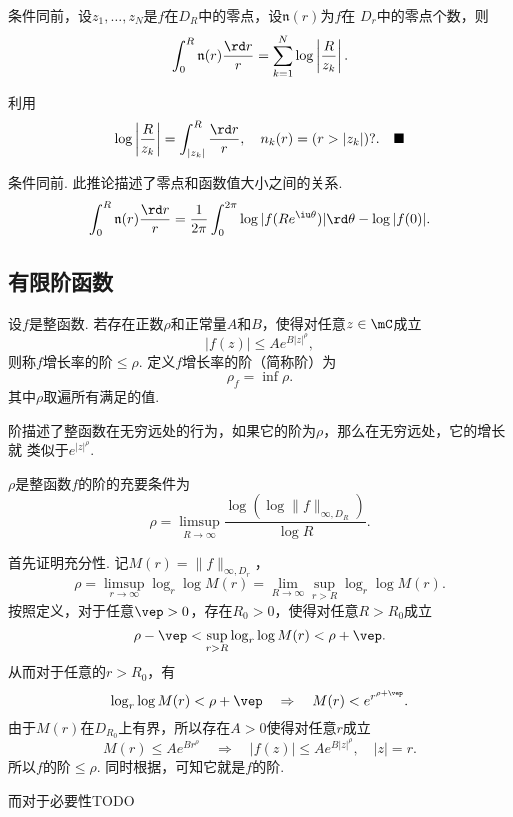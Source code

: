   \begin{lemma}
    条件同前，设$z_1,\dots,z_N$是$f$在$D_R$中的零点，设$\mathfrak{n}(r)$为$f$在
    $D_r$中的零点个数，则
    \[
      \int_0^R \mathfrak{n}(r)\frac{\rd r}{r} = 
      \sum_{k=1}^N\log\left| \frac{R}{z_k} \right|.
    \]
  \end{lemma}
  \proof
    利用
    \[
      \log\left| \frac{R}{z_k} \right|=\int_{|z_k|}^R\frac{\rd r}{r},
      \quad n_k(r) = ( r > |z_k| )?.\quad\blacksquare
    \]

  \begin{cor}
    \label{cor: 整函数、零点、模}
    条件同前. 此推论描述了零点和函数值大小之间的关系.
    \[
      \int_0^R\mathfrak{n}(r)\frac{\rd r}{r} = \frac{1}{2\pi}
      \int_0^{2\pi}\log|f(Re^{\iu\theta})|\rd\theta - \log|f(0)|.
    \]
  \end{cor}


\subsection{有限阶函数}
  \begin{defi}
    \label{defi: 整函数的阶}
    设$f$是整函数. 若存在正数$\rho$和正常量$A$和$B$，使得对任意$z\in\mC$成立
    \begin{equation}
      \label{equ: 整函数的阶、小于等于}
      |f(z)| \le Ae^{B|z|^\rho},
    \end{equation}
    则称$f$增长率的阶$\le\rho$. 定义$f$增长率的阶（简称阶）为
    \[
      \rho_f = \inf\rho.
    \]
    其中$\rho$取遍所有满足的值.
  \end{defi}
  \remark
    阶描述了整函数在无穷远处的行为，如果它的阶为$\rho$，那么在无穷远处，它的增长就
    类似于$e^{|z|^\rho}$.

  \begin{thm}[等价定义]
    $\rho$是整函数$f$的阶的充要条件为
    \[
      \rho = \limsup_{R\to\infty}\frac{\log(\log\|f\|_{\infty,D_R})}{\log R}.
    \]
  \end{thm}
  \proof
    首先证明充分性. 记$M(r) = \|f\|_{\infty, D_r}$，
    \[
      \rho = \limsup_{r\to\infty}\log_r\log M(r) = \lim_{R\to\infty}\sup_{r>R}
      \log_r\log M(r).
    \]
    按照定义，对于任意$\vep>0$，存在$R_0>0$，使得对任意$R>R_0$成立
    \begin{equation}
      \label{equ: 阶等价定义证明1}
      \rho - \vep < \sup_{r>R}\log_r\log M(r) < \rho + \vep.
    \end{equation}
    从而对于任意的$r>R_0$，有
    \[
      \log_r\log M(r) < \rho + \vep \quad\Rightarrow\quad
      M(r) < e^{r^{\rho+\vep}}.
    \]
    由于$M(r)$在$D_{R_0}$上有界，所以存在$A>0$使得对任意$r$成立
    \[
      M(r) \le Ae^{Br^\rho} \quad\Rightarrow\quad |f(z)|\le Ae^{B|z|^\rho},\quad |z|=r.
    \]
    所以$f$的阶$\le\rho$. 同时根据，可知它就是$f$的阶.\par
    而对于必要性TODO

